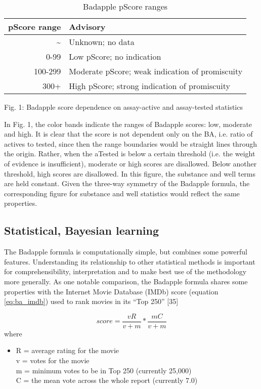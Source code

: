 \begin{table}
\caption{Badapple pScore ranges}
\begin{center}
\begin{tabular}{ |r|l| } 
\hline
\textbf{pScore range} & \textbf{Advisory} \\
\hline
\~{} & Unknown; no data \\
0-99 & Low pScore; no indication \\
100-299 & Moderate pScore; weak indication of promiscuity \\
300+ & High pScore; strong indication of promiscuity \\
\hline
\end{tabular}
\end{center}
\label{table:ba_ranges}
\end{table}



Fig. 1: Badapple score dependence on assay-active and assay-tested statistics

In Fig. 1, the color bands indicate the ranges of Badapple scores: low, moderate and high. It is clear that the score is not dependent only on the BA, i.e. ratio of actives to tested, since then the range boundaries would be straight lines through the origin. Rather, when the aTested is below a certain threshold (i.e. the weight of evidence is insufficient), moderate or high scores are disallowed. Below another threshold, high scores are disallowed. In this figure, the substance and well terms are held constant. Given the three-way symmetry of the Badapple formula, the corresponding figure for substance and well statistics would reflect the same properties.

\subsection{Statistical, Bayesian learning}

The Badapple formula is computationally simple, but combines some powerful features. Understanding its relationship to other statistical methods is important for comprehensibility, interpretation and to make best use of the methodology more generally. As one notable comparison, the Badapple formula shares some properties with the Internet Movie Database (IMDb) score (equation \ref{eq:ba_imdb}) used to rank movies in its “Top 250” [35]

\begin{equation}
score = \frac{vR}{v + m} * \frac{mC}{v + m}
\label{eq:ba_imdb}
\end{equation}
where
\begin{itemize}
\item[] R = average rating for the movie \\
v = votes for the movie \\
m = minimum votes to be in Top 250 (currently 25,000) \\
C = the mean vote across the whole report (currently 7.0) 
\end{itemize}


